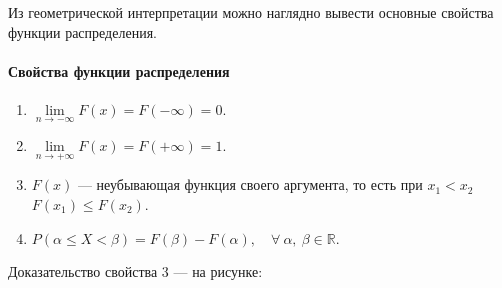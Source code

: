 \documentclass[a4paper]{article}
\newcommand{\sleq}{\leqslant}
\begin{document}

                Из геометрической интерпретации можно наглядно вывести основные свойства функции распределения.

                \paragraph{Свойства функции распределения}

                    \begin{enumerate}
                        \item $\lim\limits_{n \to -\infty} F(x) = F(-\infty) = 0 .$
                        \item $\lim\limits_{n \to +\infty} F(x) = F(+\infty) = 1 .$
                        \item $F(x)$ --- неубывающая функция своего аргумента, то есть при $x_1 < x_2$ \:$F(x_1) \sleq F(x_2)$.
                        \item $P(\alpha \sleq X < \beta) = F(\beta) - F(\alpha) , \quad \forall \: \alpha , \: \beta \in \mathbb{R}$.
                    \end{enumerate}

                    Доказательство свойства 3 --- на рисунке:
\end{document}
